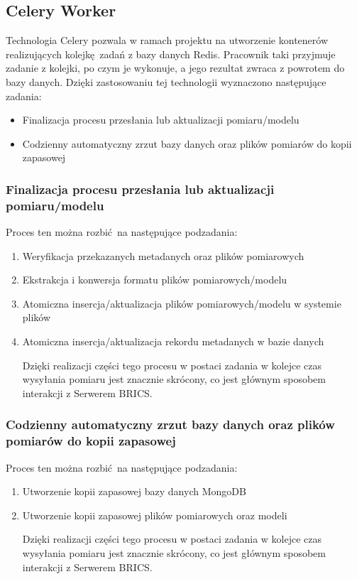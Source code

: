 	\subsection{Celery Worker}
	\label{tasks}
	
	Technologia Celery pozwala w ramach projektu na utworzenie kontenerów realizujących kolejkę zadań z bazy danych Redis. Pracownik taki przyjmuje zadanie z kolejki, po czym je wykonuje, a jego rezultat zwraca z powrotem do bazy danych. Dzięki zastosowaniu tej technologii wyznaczono następujące zadania:
	
	\begin{itemize}
		\item {Finalizacja procesu przesłania lub aktualizacji pomiaru/modelu}
		\item {Codzienny automatyczny zrzut bazy danych oraz plików pomiarów do kopii zapasowej}
	\end{itemize}
	
	\subsubsection{Finalizacja procesu przesłania lub aktualizacji pomiaru/modelu}
	Proces ten można rozbić na następujące podzadania:
	
	\begin{enumerate}
		\item {Weryfikacja przekazanych metadanych oraz plików pomiarowych}
		\item {Ekstrakcja i konwersja formatu plików pomiarowych/modelu}
		\item {Atomiczna insercja/aktualizacja plików pomiarowych/modelu w systemie plików}
		\item {Atomiczna insercja/aktualizacja rekordu metadanych w bazie danych}
		
	Dzięki realizacji części tego procesu w postaci zadania w kolejce czas wysyłania pomiaru jest znacznie skrócony, co jest głównym sposobem interakcji z Serwerem BRICS.
	\end{enumerate}
	
	\subsubsection{Codzienny automatyczny zrzut bazy danych oraz plików pomiarów do kopii zapasowej}
	Proces ten można rozbić na następujące podzadania:
	
	\begin{enumerate}
		\item {Utworzenie kopii zapasowej bazy danych MongoDB}
		\item {Utworzenie kopii zapasowej plików pomiarowych oraz modeli}
		
		Dzięki realizacji części tego procesu w postaci zadania w kolejce czas wysyłania pomiaru jest znacznie skrócony, co jest głównym sposobem interakcji z Serwerem BRICS.
	\end{enumerate}
	
